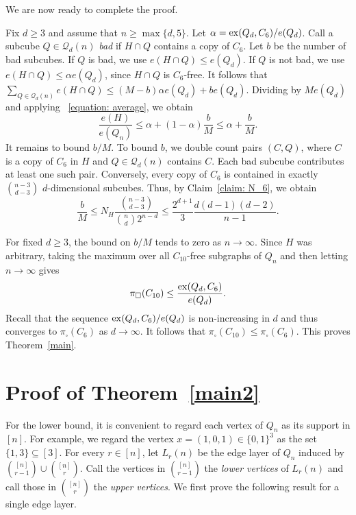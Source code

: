 \documentclass[11pt]{article}
\makeatletter
\theoremstyle{plain}
\theoremstyle{definition}
\renewenvironment{proof}[1][\proofname]
{\par\pushQED{\qed}
	\normalfont\topsep6\p@\@plus6\p@\relax\trivlist
	\item[\hskip\labelsep\bfseries#1\@addpunct{.}]
	\ignorespaces}
{\popQED\endtrivlist\@endpefalse}
\newcommand{\ex}{{\rm ex}}
\makeatother
\begin{document}
We are now ready to complete the proof.

\label{proof:main}
\begin{proof}[Proof of Theorem~\ref{main}]

Fix $d \geq 3$ and assume that $n \geq \max\{d,5\}$. 
Let $\alpha = \ex(Q_d,C_6)/e(Q_d)$.
Call a subcube $Q \in \mathcal{Q}_{d}(n)$ \emph{bad} if $H \cap Q$ contains a copy of $C_6$. 
Let $b$ be the number of bad subcubes. 
If $Q$ is bad, we use $e(H \cap Q) \leq e(Q_d)$. 
If $Q$ is not bad, we use $e(H \cap Q) \leq \alpha e(Q_d)$, since $H \cap Q$ is $C_6$-free. 
It follows that $\sum_{Q \in \mathcal{Q}_d(n)} e(H \cap Q) \leq (M-b)\alpha e(Q_d) + be(Q_d)$.
Dividing by $Me(Q_d)$ and applying ~\eqref{equation: average}, we obtain
\[
    \frac{e(H)}{e(Q_n)} \leq \alpha + (1-\alpha)\frac{b}{M} \leq \alpha + \frac{b}{M}.
\]
It remains to bound $b/M$. 
To bound $b$, we double count pairs $(C,Q)$, where $C$ is a copy of $C_6$ in $H$ and $Q \in \mathcal{Q}_d(n)$ contains $C$. 
Each bad subcube contributes at least one such pair.
Conversely, every copy of $C_6$ is contained in exactly $\binom{n-3}{d-3}$ $d$-dimensional subcubes. 
Thus, by Claim~\ref{claim: N_6}, we obtain 
\[
    \frac{b}{M} \leq N_H\frac{\binom{n-3}{d-3}}{\binom{n}{d}2^{n-d}} \leq \frac{2^{d+1}}{3}\frac{d(d-1)(d-2)}{n-1}.
\]

For fixed $d \geq 3$, the bound on $b/M$ tends to zero as $n \rightarrow \infty$. 
Since $H$ was arbitrary, taking the maximum over all $C_{10}$-free subgraphs of $Q_n$ and then letting $n \to \infty$ gives
\[
    \pi_{\square}(C_{10})
    \leq
    \frac{\ex(Q_d,C_6)}{e(Q_d)}.
\]
Recall that the sequence $\ex(Q_d,C_{6})/e(Q_d)$ is non-increasing in $d$ and thus converges to $\pi_{\square}(C_6)$ as $d \rightarrow \infty$. 
It follows that $\pi_{\square}(C_{10}) \leq \pi_{\square}(C_6)$. 
This proves Theorem~\ref{main}.

\end{proof}

\section{Proof of Theorem~\ref{main2}}

For the lower bound, it is convenient to regard each vertex of $Q_n$ as its support in $[n]$. 
For example, we regard the vertex $x = (1,0,1) \in \{0,1\}^3$ as the set $\{1,3\} \subseteq [3]$.
For every $r \in [n]$, let $L_r(n)$ be the edge layer of $Q_n$ induced by $\binom{[n]}{r-1} \cup \binom{[n]}{r}$. 
Call the vertices in $\binom{[n]}{r-1}$ the \emph{lower vertices} of $L_r(n)$ and call those in $\binom{[n]}{r}$ the \emph{upper vertices}. 
We first prove the following result for a single edge layer.
\end{document}
